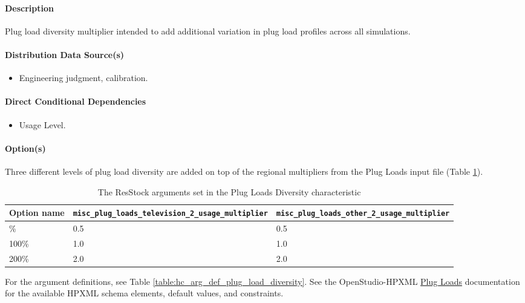 \paragraph{Description}
Plug load diversity multiplier intended to add additional variation in plug load profiles across all simulations.
\paragraph{Distribution Data Source(s)}
\begin{itemize}
 
\item
  Engineering judgment, calibration.
\end{itemize}
\paragraph{Direct Conditional Dependencies}
\begin{itemize}
    \item Usage Level.
\end{itemize}
\paragraph{Option(s)}
Three different levels of plug load diversity are added on top of the regional multipliers from the Plug Loads input file (Table \ref{table:hc_opt_plug_load_diversity}). 

\begin{longtable}[]{|p{2.5cm}|p{4.5cm}|p{4.5cm}|} \caption{The ResStock arguments set in the Plug Loads Diversity characteristic} \label{table:hc_opt_plug_load_diversity}  \\
\toprule\noalign{}
Option name &
\texttt{misc\_plug\_loads\_television\_2\_usage\_multiplier} &
\texttt{misc\_plug\_loads\_other\_2\_usage\_multiplier} \\
\midrule\noalign{}
\endhead
\bottomrule\noalign{}
\endlastfoot
50\% & 0.5 & 0.5 \\
100\% & 1.0 & 1.0 \\
200\% & 2.0 & 2.0 \\
\end{longtable}
For the argument definitions, see Table \ref{table:hc_arg_def_plug_load_diversity}. See the OpenStudio-HPXML \href{https://openstudio-hpxml.readthedocs.io/en/v1.8.1/workflow_inputs.html#hpxml-plug-loads}{Plug Loads} documentation for the available HPXML schema elements, default values, and constraints.


